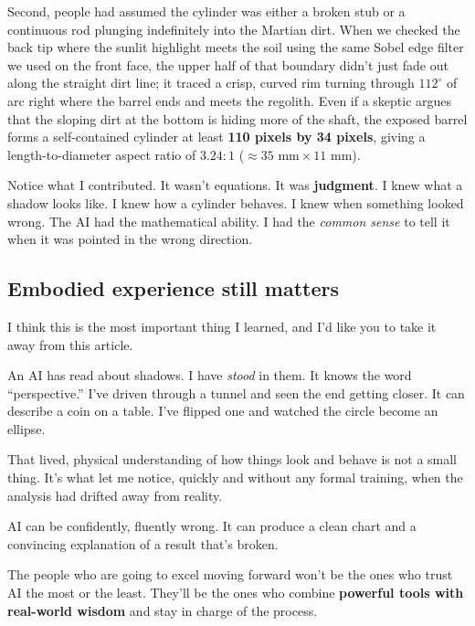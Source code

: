 \documentclass[11pt,a4paper]{article}
\newcommand{\horizontalrule}{}
\begin{document}
Second, people had assumed the cylinder was either a broken stub or a continuous rod plunging indefinitely into the Martian dirt. When we checked the back tip where the sunlit highlight meets the soil using the same Sobel edge filter we used on the front face, the upper half of that boundary didn't just fade out along the straight dirt line; it traced a crisp, curved rim turning through $112^\circ$ of arc right where the barrel ends and meets the regolith. Even if a skeptic argues that the sloping dirt at the bottom is hiding more of the shaft, the exposed barrel forms a self-contained cylinder at least \textbf{110 pixels by 34 pixels}, giving a length-to-diameter aspect ratio of \textbf{$3.24 : 1$} ($\approx 35\text{ mm} \times 11\text{ mm}$).

Notice what I contributed. It wasn't equations. It was \textbf{judgment}. I knew what a shadow looks like. I knew how a cylinder behaves. I knew when something looked wrong. The AI had the mathematical ability. I had the \textit{common sense} to tell it when it was pointed in the wrong direction.

\horizontalrule

\subsection*{Embodied experience still matters}

I think this is the most important thing I learned, and I'd like you to take it away from this article.

An AI has read about shadows. I have \textit{stood} in them. It knows the word ``perspective.'' I've driven through a tunnel and seen the end getting closer. It can describe a coin on a table. I've flipped one and watched the circle become an ellipse.

That lived, physical understanding of how things look and behave is not a small thing. It's what let me notice, quickly and without any formal training, when the analysis had drifted away from reality.

AI can be confidently, fluently wrong. It can produce a clean chart and a convincing explanation of a result that's broken.

The people who are going to excel moving forward won't be the ones who trust AI the most or the least. They'll be the ones who combine \textbf{powerful tools with real-world wisdom} and stay in charge of the process.

\horizontalrule
\end{document}
